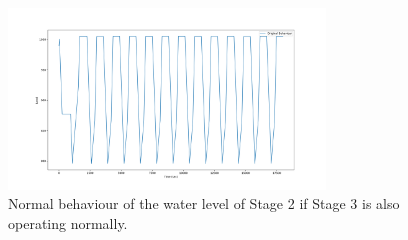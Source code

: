 {%


\begin{figure}[t]
  \includegraphics[width=0.75\textwidth]{Figures/Stage2Normal.png}
  \caption{Normal behaviour of the water level of Stage 2 if Stage 3 is also operating normally.}
  \label{fig:Stage2Normal}
\end{figure}


}
